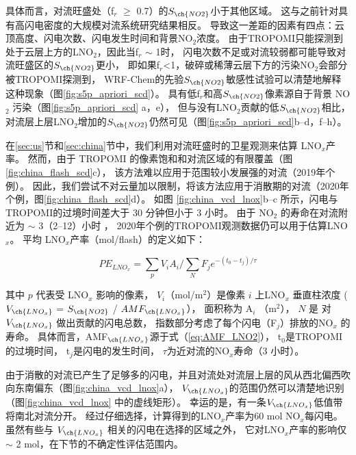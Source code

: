 具体而言，对流旺盛处（f$_r$ $\geq$ 0.7）的$S_{\ch{NO2}}$小于其他区域。
这与之前针对具有高闪电密度的大规模对流系统研究结果相反\citep{Beirle.2009}。
导致这一差距的因素有四点：云顶高度、闪电次数、闪电发生时间和背景NO$_2$浓度。
由于TROPOMI只能探测到处于云层上方的LNO$_2$，因此当f$_r$ $\sim$ 1时，
闪电次数不足或对流较弱都可能导致对流旺盛区的$S_{\ch{NO2}}$更小，
即如果f$_r$<1，破碎或稀薄云层下方的污染NO$_2$会部分被TROPOMI探测到，
WRF-Chem的先验$S_{\ch{NO2}}$敏感性试验可以清楚地解释这种现象（图\ref{fig:s5p_apriori_scd}）。
具有低f$_r$和高$S_{\ch{NO2}}$像素源自于背景 NO$_2$ 污染（图\ref{fig:s5p_apriori_scd} a，e），
但与没有LNO$_2$贡献的低$S_{\ch{NO2}}$相比，对流层上层LNO$_2$增加的$S_{\ch{NO2}}$仍然可见（图\ref{fig:s5p_apriori_scd}b--d，f--h）。

在\ref{sec:us}节和\ref{sec:china}节中，我们利用对流旺盛时的卫星观测来估算 LNO$_x$产率。
然而，由于 TROPOMI 的像素饱和和对流区域的有限覆盖（图\ref{fig:china_flash_scd}c），
该方法难以应用于范围较小发展强的对流（2019年个例）。
因此，我们尝试不对云量加以限制，将该方法应用于消散期的对流（2020年个例，图\ref{fig:china_flash_scd}d）。
如图 \ref{fig:china_vcd_lnox}b--c 所示，闪电与TROPOMI的过境时间差大于 30 分钟但小于 3 小时。
由于 NO$_2$ 的寿命在对流附近为 $\sim$ 3（2--12）小时 \citep{Nault.2016}，
2020年个例的TROPOMI观测数据仍可以用于估算LNO$_x$。
平均 LNO$_x$产率（mol/flash）的定义如下：


\begin{equation} \label{eq:lnox}
PE_{LNO_x} = \sum_{p} V_i A_i / \sum_{N} F_j e^{-(t_0 - t_j) / \tau}
\end{equation}

其中 $p$ 代表受 LNO$_x$ 影响的像素，
$V_i$（mol/m$^2$）是像素 $i$ 上LNO$_x$ 垂直柱浓度 ($V_{\ch{LNO_x}}$ = $S_{\ch{NO2}}$ / $AMF_{\ch{LNO_x}}$），
面积称为 A$_i$ （m$^2$），
$N$ 是 对 $V_{\ch{LNO_x}}$ 做出贡献的闪电总数，
指数部分考虑了每个闪电（F$_j$）排放的NO$_x$ 的寿命。
具体而言，AMF$_{\ch{LNO_x}}$源于式（\ref{eq:AMF_LNO2}），
t$_0$是TROPOMI的过境时间，
t$_j$是闪电的发生时间，
$\tau$为近对流的NO$_x$寿命（3 小时）。

由于消散的对流已产生了足够多的闪电，并且对流处对流层上层的风从西北偏西吹向东南偏东（图\ref{fig:china_vcd_lnox}a），
$V_{\ch{LNO_x}}$的范围仍然可以清楚地识别（图\ref{fig:china_vcd_lnox} 中的虚线矩形）。
幸运的是，有一条$V_{\ch{LNO_x}}$低值带将南北对流分开。
经过仔细选择，计算得到的LNO$_x$产率为60 mol NO$_x$每闪电。
虽然有些与 $V_{\ch{LNO_x}}$ 相关的闪电在选择的区域之外，
它对LNO$_x$产率的影响仅 $\sim$ 2 mol，在下节的不确定性评估范围内。


